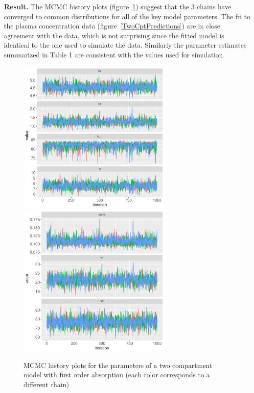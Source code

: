 \documentclass[11pt]{amsart}
\begin{document}
\textbf{Result.} The MCMC history plots (figure~\ref{TwoCptMCMC}) suggest that the 3 chains have converged to common distributions for all of the key model parameters. The  fit to the plasma concentration data (figure~\ref{TwoCptPredictions}) are in close agreement with the data, which is not surprising since the fitted model is identical to the one used to simulate the data. Similarly the parameter estimates summarized in Table 1 are consistent with the values used for simulation.

\begin{figure}[htbp]
\includegraphics[width=3.0in,trim=0in 0in 0 0in]{graphics/TwoCptModelPlots001.pdf}
\includegraphics[width=3.0in,trim=0in 0in 0 0in]{graphics/TwoCptModelPlots002.pdf}
\caption{{MCMC history plots for the parameters of a two compartment model with first order absorption (each color corresponds to a different chain)}}
\label{TwoCptMCMC}
\end{figure}
\end{document}
